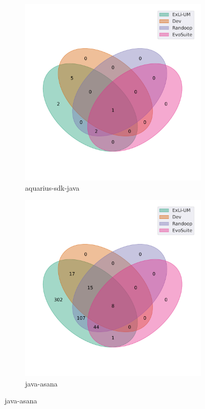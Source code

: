 
\begin{figure}[t]
\begin{subfigure}[b]{0.45\textwidth}
\includegraphics[width=\textwidth]{figures/venn/AquaticInformatics_aquarius-sdk-java-venn.pdf}
\vspace{-10pt}
\caption{aquarius-sdk-java}
\label{fig:venn-AquaticInformatics_aquarius-sdk-java}
\end{subfigure}
\hfill
\begin{subfigure}[b]{0.45\textwidth}
\includegraphics[width=\textwidth]{figures/venn/Asana_java-asana-venn.pdf}
\vspace{-10pt}
\caption{java-asana}
\label{fig:venn-Asana_java-asana}
\end{subfigure}
\end{figure}
